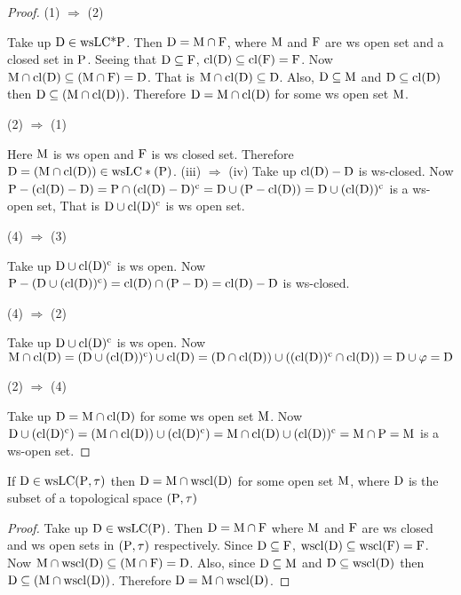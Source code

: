 \begin{proof}
(1) $\Rightarrow$ (2)

Take up $\mathrm{D} \in \mathrm{ws}\mathrm{LC}\text{*}\mathrm{P}$. Then $\mathrm{D} = \mathrm{M} \cap \mathrm{F}$, where $\mathrm{M}$ and $\mathrm{F}$ are ws open set and a closed set in $\mathrm{P}$. Seeing that $\mathrm{D} \subseteq \mathrm{F}$, $\mathrm{cl}(\mathrm{D}) \subseteq \mathrm{cl}(\mathrm{F}) = \mathrm{F}$. Now $\mathrm{M} \cap \mathrm{cl}(\mathrm{D}) \subseteq (\mathrm{M} \cap \mathrm{F}) = \mathrm{D}$. That is $\mathrm{M} \cap \mathrm{cl}(\mathrm{D}) \subseteq \mathrm{D}$. Also, $\mathrm{D} \subseteq \mathrm{M}$ and $\mathrm{D} \subseteq\mathrm{cl}(\mathrm{D})$ then $\mathrm{D} \subseteq (\mathrm{M} \cap \mathrm{cl}(\mathrm{D}))$. Therefore $\mathrm{D}= \mathrm{M} \cap \mathrm{cl}(\mathrm{D})$ for some ws open set $\mathrm{M}$.

(2) $\Rightarrow$ (1)

Here $\mathrm{M}$ is ws open and $\mathrm{F}$ is ws closed set. Therefore $\mathrm{D} = (\mathrm{M} \cap \mathrm{cl}(\mathrm{D})) \in \mathrm{ws}\mathrm{LC} * (\mathrm{P})$. (iii) $\Rightarrow$ (iv) Take up $\mathrm{cl}(\mathrm{D}) - \mathrm{D}$ is ws-closed. Now $\mathrm{P} - (\mathrm{cl}(\mathrm{D}) - \mathrm{D}) = \mathrm{P} \cap (\mathrm{cl}(\mathrm{D}) - \mathrm{D})^{\text{c}} = \mathrm{D} \cup (\mathrm{P} - \mathrm{cl}(\mathrm{D})) = \mathrm{D} \cup (\mathrm{cl}(\mathrm{D}))^{\text{c}}$ is a ws-open set, That is $\mathrm{D} \cup \mathrm{cl}(\mathrm{D})^{\text{c}}$ is ws open set.

(4) $\Rightarrow$ (3)

Take up $\mathrm{D} \cup \mathrm{cl}(\mathrm{D})^{\text{c}}$ is ws open. Now $\mathrm{P} - (\mathrm{D} \cup (\mathrm{cl}(\mathrm{D}))^{\text{c}}) = \mathrm{cl}(\mathrm{D}) \cap (\mathrm{P} - \mathrm{D}) = \mathrm{cl}(\mathrm{D}) - \mathrm{D}$ is ws-closed.

(4) $\Rightarrow$ (2)

Take up $\mathrm{D} \cup \mathrm{cl}(\mathrm{D})^{\text{c}}$ is ws open. Now $\mathrm{M}\cap \mathrm{cl}(\mathrm{D}) = (\mathrm{D} \cup (\mathrm{cl}(\mathrm{D}))^{\text{c}}) \cup \mathrm{cl}(\mathrm{D}) = (\mathrm{D} \cap \mathrm{cl}(\mathrm{D})) \cup ((\mathrm{cl}(\mathrm{D}))^{\text{c}} \cap \mathrm{cl}(\mathrm{D})) = \mathrm{D} \cup \varphi = \mathrm{D}$

(2) $\Rightarrow$ (4)

Take up $\mathrm{D} = \mathrm{M} \cap \mathrm{cl}(\mathrm{D})$ for some ws open set $\mathrm{M}$. Now $\mathrm{D} \cup (\mathrm{cl}(\mathrm{D})^{\text{c}}) = (\mathrm{M} \cap \mathrm{cl}(\mathrm{D})) \cup (\mathrm{cl}(\mathrm{D})^{\text{c}}) = \mathrm{M} \cap \mathrm{cl}(\mathrm{D}) \cup (\mathrm{cl}(\mathrm{D}))^{\text{c}} = \mathrm{M} \cap \mathrm{P} = \mathrm{M}$ is a ws-open set.
\end{proof}

\begin{thm}\label{thm6.2.26}
If $\mathrm{D} \in \mathrm{ws}\mathrm{LC}(\mathrm{P}, \tau)$ then $\mathrm{D} = \mathrm{M}\cap \mathrm{ws}\mathrm{cl}(\mathrm{D})$ for some open set $\mathrm{M}$, where $\mathrm{D}$ is the subset of a topological space $(\mathrm{P}, \tau)$
\end{thm}

\begin{proof}
Take up $\mathrm{D} \in \mathrm{ws}\mathrm{LC}(\mathrm{P})$. Then $\mathrm{D} = \mathrm{M} \cap \mathrm{F}$ where $\mathrm{M}$ and $\mathrm{F}$ are ws closed and ws open sets in $(\mathrm{P},\tau)$ respectively. Since $\mathrm{D} \subseteq \mathrm{F}$, $\mathrm{ws}\mathrm{cl}(\mathrm{D}) \subseteq \mathrm{ws}\mathrm{cl}(\mathrm{F})=\mathrm{F}$. Now $\mathrm{M} \cap \mathrm{ws}\mathrm{cl}(\mathrm{D}) \subseteq (\mathrm{M} \cap \mathrm{F}) = \mathrm{D}$. Also, since $\mathrm{D} \subseteq \mathrm{M}$ and $\mathrm{D} \subseteq \mathrm{ws}\mathrm{cl}(\mathrm{D})$ then $\mathrm{D} \subseteq (\mathrm{M} \cap \mathrm{ws}\mathrm{cl}(\mathrm{D}))$. Therefore $\mathrm{D} = \mathrm{M} \cap \mathrm{ws}\mathrm{cl}(\mathrm{D})$.
\end{proof}

